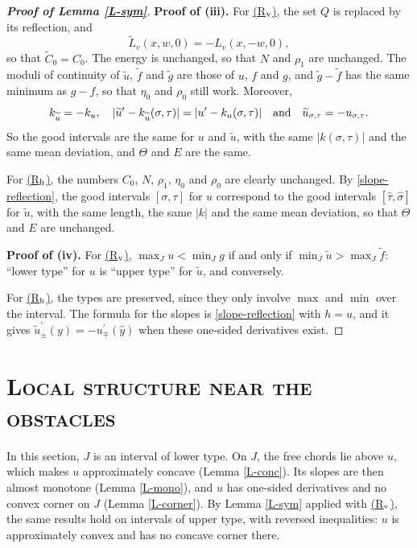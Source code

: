 \documentclass[reqno,12pt]{amsart}
\numberwithin{equation}{section}
\newcommand{\Rv}{\hyperref[HypS1]{{\sf (R$_{\rm v}$)}}}
\newcommand{\Rh}{\hyperref[HypS2]{{\sf (R$_{\rm h}$)}}}
\theoremstyle{remark}
\begin{document}
\begin{proof}[\bf Proof of Lemma \ref{L-sym}]
{\bf Proof of (iii).} For \Rv{}, the set $Q$ is replaced by its reflection, and
\begin{equation*}
\widetilde L_v(x,w,0)=-L_v(x,-w,0),
\end{equation*}
so that $\widetilde C_0=C_0$. The energy is unchanged, so that $N$ and $\rho_1$ are unchanged. The moduli of continuity of $\widetilde u$, $\widetilde f$ and $\widetilde g$ are those of $u$, $f$ and $g$, and $\widetilde g-\widetilde f$ has the same minimum as $g-f$, so that $\eta_0$ and $\rho_0$ still work. Moreover,
\begin{equation*}
k_{\widetilde u}=-k_u,\quad|\widetilde u^\prime-k_{\widetilde u}(\sigma,\tau)|=|u^\prime-k_u(\sigma,\tau)|\quad\hbox{and}\quad\widetilde u_{\sigma,\tau}=-u_{\sigma,\tau}.
\end{equation*}
So the good intervals are the same for $u$ and $\widetilde u$, with the same $|k(\sigma,\tau)|$ and the same mean deviation, and $\Theta$ and $E$ are the same.

\smallskip

For \Rh{}, the numbers $C_0$, $N$, $\rho_1$, $\eta_0$ and $\rho_0$ are clearly unchanged. By \eqref{slope-reflection}, the good intervals $[\sigma,\tau]$ for $u$ correspond to the good intervals $[\widehat\tau,\widehat\sigma]$ for $\widetilde u$, with the same length, the same $|k|$ and the same mean deviation, so that $\Theta$ and $E$ are unchanged.

\medskip

{\bf Proof of (iv).} For \Rv{}, $\max_Ju<\min_Jg$ if and only if $\min_J\widetilde u>\max_J\widetilde f$: ``lower type'' for $u$ is ``upper type'' for $\widetilde u$, and conversely.

\smallskip

For \Rh{}, the types are preserved, since they only involve $\max$ and $\min$ over the interval. The formula for the slopes is \eqref{slope-reflection} with $h=u$, and it gives $\widetilde u^\prime_\pm(y)=-u^\prime_\mp(\widehat y)$ when these one-sided derivatives exist.
\end{proof}

\section{\textsc{\textsf{Local structure near the obstacles}}}\label{Sect-Concavity}

In this section, $J$ is an interval of lower type. On $J$, the free chords lie above $u$, which makes $u$ approximately concave (Lemma \ref{L-conc}). Its slopes are then almost monotone (Lemma \ref{L-mono}), and $u$ has one-sided derivatives and no convex corner on $J$ (Lemma \ref{L-corner}). By Lemma \ref{L-sym} applied with \Rv{}, the same results hold on intervals of upper type, with reversed inequalities: $u$ is approximately convex and has no concave corner there.
\end{document}
